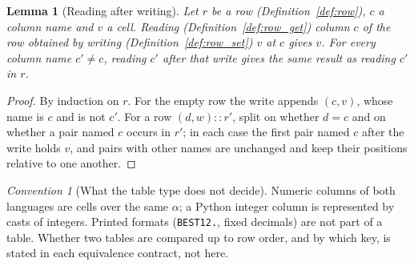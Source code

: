 \documentclass[11pt,a4paper]{article}
\theoremstyle{definition}
\theoremstyle{plain}
\newtheorem{lemma}{Lemma}
\theoremstyle{remark}
\newtheorem{convention}{Convention}
\newcommand{\code}[1]{\texttt{#1}}
\begin{document}
\begin{lemma}[Reading after writing]\label{lem:row_get_set}
Let $r$ be a row (Definition~\ref{def:row}), $c$ a column name and $v$ a cell. Reading
(Definition~\ref{def:row_get}) column $c$ of the row obtained by writing
(Definition~\ref{def:row_set}) $v$ at $c$ gives $v$. For every column name $c' \ne c$, reading
$c'$ after that write gives the same result as reading $c'$ in $r$.
\end{lemma}
\begin{proof}
By induction on $r$. For the empty row the write appends $(c, v)$, whose name is $c$ and is not
$c'$. For a row $(d, w) :: r'$, split on whether $d = c$ and on whether a pair named $c$ occurs
in $r'$; in each case the first pair named $c$ after the write holds $v$, and pairs with other
names are unchanged and keep their positions relative to one another.
\end{proof}

\begin{convention}[What the table type does not decide]\label{conv:tables}
Numeric columns of both languages are cells over the same $\alpha$; a Python integer column is
represented by casts of integers. Printed formats (\code{BEST12.}, fixed decimals) are not
part of a table. Whether two tables are compared up to row order, and by which key, is stated
in each equivalence contract, not here.
\end{convention}
\end{document}
